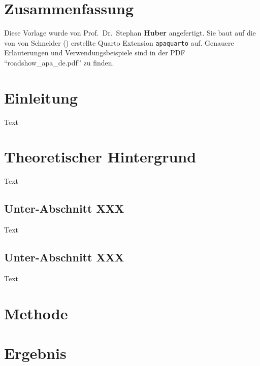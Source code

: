 \documentclass[
  stu,
  floatsintext,
  longtable,
  a4paper,
  nolmodern,
  notxfonts,
  notimes,
  donotrepeattitle,
  colorlinks=true,linkcolor=blue,citecolor=blue,urlcolor=blue]{apa7}
\begin{document}
\setcounter{secnumdepth}{-\maxdimen} %

\setlength\LTleft{0pt}


\section*{Zusammenfassung}\label{zusammenfassung}

\noindent  Diese Vorlage wurde von Prof.~Dr.~Stephan \textbf{Huber}
angefertigt. Sie baut auf die von von Schneider
() erstellte Quarto Extension
\texttt{apaquarto} auf. Genauere Erläuterungen und Verwendungsbeispiele
sind in der PDF ``roadshow\_apa\_de.pdf'' zu finden.

\newpage
\thispagestyle{empty}
\tableofcontents

\newpage

\section{Einleitung}\label{einleitung}

Text

\section{Theoretischer Hintergrund}\label{theoretischer-hintergrund}

Text

\subsection{Unter-Abschnitt XXX}\label{unter-abschnitt-xxx}

Text

\subsection{Unter-Abschnitt XXX}\label{unter-abschnitt-xxx-1}

Text

\section{Methode}\label{methode}

\section{Ergebnis}\label{ergebnis}
\end{document}

